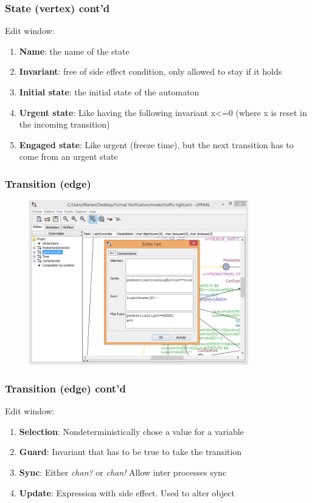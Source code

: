 \documentclass{bredelebeamer}
\begin{document}
\begin{frame}
	\frametitle{State (vertex) cont'd}
	\begin{block}{Edit window:}
		\begin{enumerate}
			\item \textbf{Name}: the name of the state
			\item \textbf{Invariant}: free of side effect condition, only allowed to stay if it holds
			\item \textbf{Initial state}: the initial state of the automaton
			\item \textbf{Urgent state}: Like having the following invariant x<=0 (where x is reset in the incoming transition)
			\item \textbf{Engaged state}: Like urgent (freeze time), but the next transition has to come from an urgent state
		\end{enumerate}
	\end{block}
\end{frame}

\begin{frame}
	\frametitle{Transition (edge)}
	\begin{figure}
    	\centering
    	\includegraphics[width = 0.85\textwidth]{uppaal_edge_editor.png}
  	\end{figure}
\end{frame}

\begin{frame}
	\frametitle{Transition (edge) cont'd}
	\begin{block}{Edit window:}
		\begin{enumerate}
			\item \textbf{Selection}: Nondeterministically chose a value for a variable
			\item \textbf{Guard}: Invariant that has to be true to take the transition
			\item \textbf{Sync}: Either \textit{chan?} or \textit{chan!} Allow inter processes sync
			\item \textbf{Update}: Expression with side effect. Used to alter object
		\end{enumerate}
	\end{block}
\end{frame}
\end{document}
